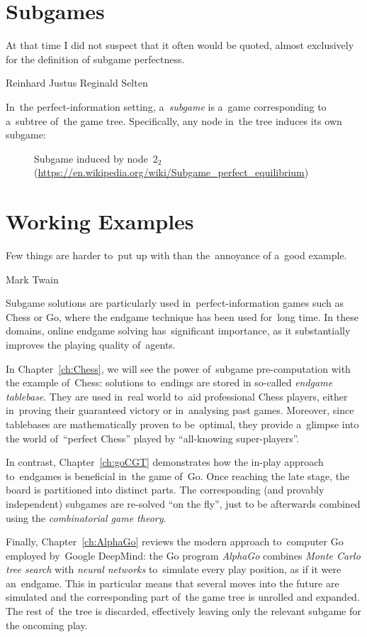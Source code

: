 \section{Subgames}
\epigraph{
  At that time I did not suspect that it\footnotemark{} often would be quoted, almost exclusively for the definition of subgame perfectness.
}{Reinhard Justus Reginald Selten}
In~the perfect-information setting, a~\emph{subgame} is a~game corresponding to a~subtree of~the game tree.
Specifically, any node in~the tree induces its own subgame:
\begin{figure}[H]
  \centering
  \scriptsize
  \def\svgwidth{.5\textwidth}
  
  \def\captionTitle{Subgame induced by node~$2_2$}
  \caption[\captionTitle]{\captionTitle{}\\ (\href{https://en.wikipedia.org/wiki/Subgame_perfect_equilibrium}{https://en.wikipedia.org/wiki/Subgame\_perfect\_equilibrium})}
  \label{fig:ext-form-subgame}
\end{figure}

\section{Working Examples}
\epigraph{
  Few things are harder to~put up with than the~annoyance of a~good example.
}{Mark Twain}
Subgame solutions are particularly used in~perfect-information games such as Chess or Go, where the endgame technique has been used for~long time.
In these domains, online endgame solving has~significant importance, as it substantially improves the playing quality of~agents.

In Chapter~\ref{ch:Chess}, we will see the power of~subgame pre-computation with the example of~Chess:
solutions to~endings are stored in so-called \emph{endgame tablebase}.
They are used in~real world to~aid professional Chess players, either in~proving their guaranteed victory or in~analysing past games.
Moreover, since tablebases are mathematically proven to be~optimal, they provide a~glimpse into the world of~``perfect Chess'' played by ``all-knowing super-players''.

In contrast, Chapter~\ref{ch:goCGT} demonstrates how the in-play approach to~endgames is beneficial in~the game of~Go.
Once reaching the late stage, the board is partitioned into distinct parts.
The corresponding (and provably independent) subgames are re-solved ``on the fly'', just to be afterwards combined using the \emph{combinatorial game theory}.

Finally, Chapter~\ref{ch:AlphaGo} reviews the modern approach to~computer Go employed by~Google DeepMind:
the Go program \emph{AlphaGo} combines \emph{Monte Carlo tree search} with \emph{neural networks} to~simulate every play position, as if it were an~endgame.
This in particular means that several moves into the future are simulated and the corresponding part of~the game tree is unrolled and expanded.
The rest of~the tree is discarded, effectively leaving only the relevant subgame for the oncoming play.
